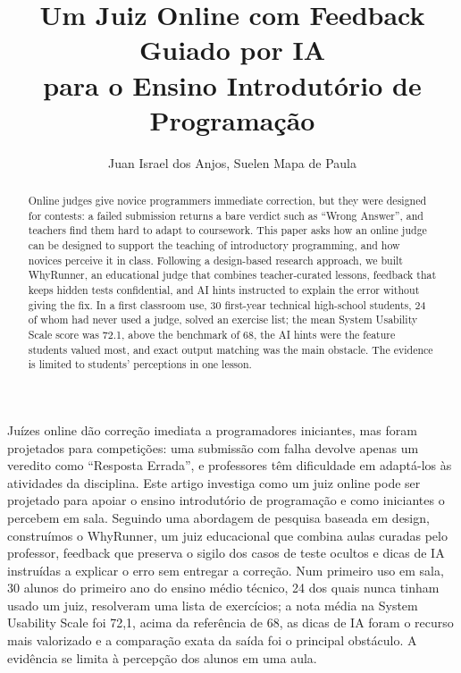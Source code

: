 \documentclass[12pt]{article}
\title{Um Juiz Online com Feedback Guiado por IA\\para o Ensino Introdutório de Programação}
\author{Juan Israel dos Anjos, Suelen Mapa de Paula}
\begin{document}
\maketitle

\begin{otherlanguage}{english}
\begin{abstract}
  Online judges give novice programmers immediate correction, but they were designed for contests: a failed submission returns a bare verdict such as ``Wrong Answer'', and teachers find them hard to adapt to coursework. This paper asks how an online judge can be designed to support the teaching of introductory programming, and how novices perceive it in class. Following a design-based research approach, we built WhyRunner, an educational judge that combines teacher-curated lessons, feedback that keeps hidden tests confidential, and AI hints instructed to explain the error without giving the fix. In a first classroom use, 30 first-year technical high-school students, 24 of whom had never used a judge, solved an exercise list; the mean System Usability Scale score was 72.1, above the benchmark of 68, the AI hints were the feature students valued most, and exact output matching was the main obstacle. The evidence is limited to students' perceptions in one lesson.
\end{abstract}
\end{otherlanguage}

\begin{resumo}
  Juízes online dão correção imediata a programadores iniciantes, mas foram projetados para competições: uma submissão com falha devolve apenas um veredito como ``Resposta Errada'', e professores têm dificuldade em adaptá-los às atividades da disciplina. Este artigo investiga como um juiz online pode ser projetado para apoiar o ensino introdutório de programação e como iniciantes o percebem em sala. Seguindo uma abordagem de pesquisa baseada em design, construímos o WhyRunner, um juiz educacional que combina aulas curadas pelo professor, feedback que preserva o sigilo dos casos de teste ocultos e dicas de IA instruídas a explicar o erro sem entregar a correção. Num primeiro uso em sala, 30 alunos do primeiro ano do ensino médio técnico, 24 dos quais nunca tinham usado um juiz, resolveram uma lista de exercícios; a nota média na System Usability Scale foi 72,1, acima da referência de 68, as dicas de IA foram o recurso mais valorizado e a comparação exata da saída foi o principal obstáculo. A evidência se limita à percepção dos alunos em uma aula.
\end{resumo}
\end{document}
